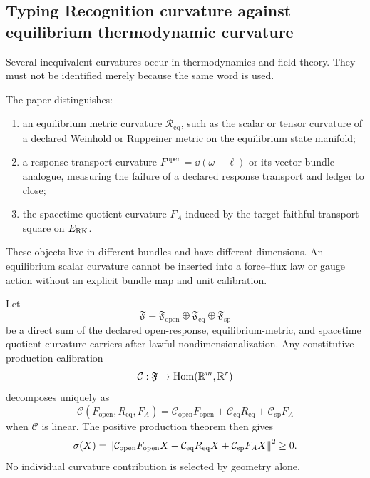 \subsection{Typing Recognition curvature against equilibrium thermodynamic curvature}
\label{sec:curvature-typing}

Several inequivalent curvatures occur in thermodynamics and field theory.  They must not be identified merely because the same word is used.

\begin{definition}
The paper distinguishes:
\begin{enumerate}[label=(\roman*)]
\item an equilibrium metric curvature $\mathcal R_{\mathrm{eq}}$, such as the scalar or tensor curvature of a declared Weinhold or Ruppeiner metric on the equilibrium state manifold;
\item a response-transport curvature $F^{\mathrm{open}}=\dd(\omega-\ell)$ or its vector-bundle analogue, measuring the failure of a declared response transport and ledger to close;
\item the spacetime quotient curvature $F_A$ induced by the target-faithful transport square on $E_{\mathrm{RK}}$.
\end{enumerate}
\end{definition}

These objects live in different bundles and have different dimensions.  An equilibrium scalar curvature cannot be inserted into a force--flux law or gauge action without an explicit bundle map and unit calibration.

\begin{proposition}
Let
\[
\mathfrak F
=
\mathfrak F_{\mathrm{open}}
\oplus
\mathfrak F_{\mathrm{eq}}
\oplus
\mathfrak F_{\mathrm{sp}}
\]
be a direct sum of the declared open-response, equilibrium-metric, and spacetime quotient-curvature carriers after lawful nondimensionalization.  Any constitutive production calibration
\[
\mathcal C:\mathfrak F\to\operatorname{Hom}(\mathbb R^m,\mathbb R^r)
\]
decomposes uniquely as
\[
\mathcal C(F_{\mathrm{open}},R_{\mathrm{eq}},F_A)
=
\mathcal C_{\mathrm{open}}F_{\mathrm{open}}
+
\mathcal C_{\mathrm{eq}}R_{\mathrm{eq}}
+
\mathcal C_{\mathrm{sp}}F_A
\]
when $\mathcal C$ is linear.  The positive production theorem then gives
\[
\sigma(X)
=
\left\lVert
\mathcal C_{\mathrm{open}}F_{\mathrm{open}}X
+
\mathcal C_{\mathrm{eq}}R_{\mathrm{eq}}X
+
\mathcal C_{\mathrm{sp}}F_AX
\right\rVert^2
\ge0.
\]
No individual curvature contribution is selected by geometry alone.
\end{proposition}

